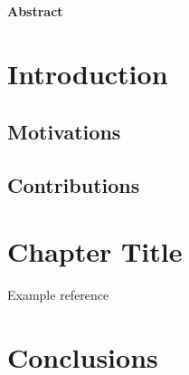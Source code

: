 \documentclass[a4paper,11pt,oneside]{book}
\begin{document}
\newpage
\thispagestyle{empty}

\begin{center}
\chapter*{}
\thispagestyle{empty}
{\Huge \textbf{Abstract}}\\
\vspace{15mm}
\end{center}

\tableofcontents \thispagestyle{empty}

\chapter*{Introduction}
\section*{Motivations} 

\section*{Contributions}



\chapter{Chapter Title}
Example reference \cite{notarstefano2011containment}

\chapter*{Conclusions}

{}



\end{document}
